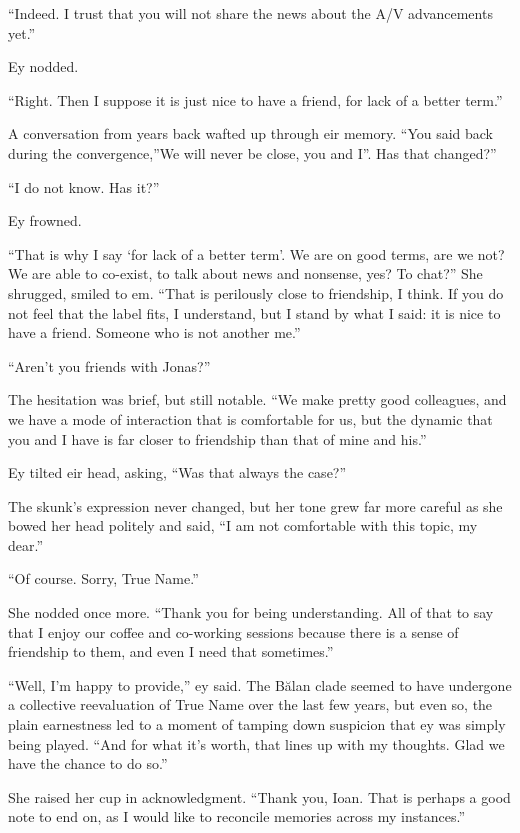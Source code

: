 ``Indeed. I trust that you will not share the news about the A/V advancements yet.''

Ey nodded.

``Right. Then I suppose it is just nice to have a friend, for lack of a better term.''

A conversation from years back wafted up through eir memory. ``You said back during the convergence,''We will never be close, you and I''. Has that changed?''

``I do not know. Has it?''

Ey frowned.

``That is why I say `for lack of a better term'. We are on good terms, are we not? We are able to co-exist, to talk about news and nonsense, yes? To chat?'' She shrugged, smiled to em. ``That is perilously close to friendship, I think. If you do not feel that the label fits, I understand, but I stand by what I said: it is nice to have a friend. Someone who is not another me.''

``Aren't you friends with Jonas?''

The hesitation was brief, but still notable. ``We make pretty good colleagues, and we have a mode of interaction that is comfortable for us, but the dynamic that you and I have is far closer to friendship than that of mine and his.''

Ey tilted eir head, asking, ``Was that always the case?''

The skunk's expression never changed, but her tone grew far more careful as she bowed her head politely and said, ``I am not comfortable with this topic, my dear.''

``Of course. Sorry, True Name.''

She nodded once more. ``Thank you for being understanding. All of that to say that I enjoy our coffee and co-working sessions because there is a sense of friendship to them, and even I need that sometimes.''

``Well, I'm happy to provide,'' ey said. The Bălan clade seemed to have undergone a collective reevaluation of True Name over the last few years, but even so, the plain earnestness led to a moment of tamping down suspicion that ey was simply being played. ``And for what it's worth, that lines up with my thoughts. Glad we have the chance to do so.''

She raised her cup in acknowledgment. ``Thank you, Ioan. That is perhaps a good note to end on, as I would like to reconcile memories across my instances.''

